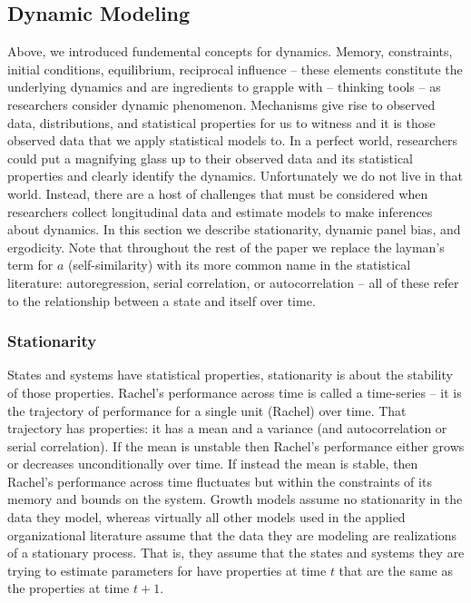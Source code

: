 \documentclass[english,,man]{apa6}
\theoremstyle{definition}
\theoremstyle{definition}
\theoremstyle{definition}
\theoremstyle{remark}
\begin{document}
\hypertarget{dynamic-modeling}{%
\subsection{Dynamic Modeling}\label{dynamic-modeling}}

Above, we introduced fundemental concepts for dynamics. Memory,
constraints, initial conditions, equilibrium, reciprocal influence --
these elements constitute the underlying dynamics and are ingredients to
grapple with -- thinking tools -- as researchers consider dynamic
phenomenon. Mechanisms give rise to observed data, distributions, and
statistical properties for us to witness and it is those observed data
that we apply statistical models to. In a perfect world, researchers
could put a magnifying glass up to their observed data and its
statistical properties and clearly identify the dynamics. Unfortunately
we do not live in that world. Instead, there are a host of challenges
that must be considered when researchers collect longitudinal data and
estimate models to make inferences about dynamics. In this section we
describe stationarity, dynamic panel bias, and ergodicity. Note that
throughout the rest of the paper we replace the layman's term for \(a\)
(self-similarity) with its more common name in the statistical
literature: autoregression, serial correlation, or autocorrelation --
all of these refer to the relationship between a state and itself over
time.

\hypertarget{stationarity}{%
\subsubsection{Stationarity}\label{stationarity}}

States and systems have statistical properties, stationarity is about
the stability of those properties. Rachel's performance across time is
called a time-series -- it is the trajectory of performance for a single
unit (Rachel) over time. That trajectory has properties: it has a mean
and a variance (and autocorrelation or serial correlation). If the mean
is unstable then Rachel's performance either grows or decreases
unconditionally over time. If instead the mean is stable, then Rachel's
performance across time fluctuates but within the constraints of its
memory and bounds on the system. Growth models assume no stationarity in
the data they model, whereas virtually all other models used in the
applied organizational literature assume that the data they are modeling
are realizations of a stationary process. That is, they assume that the
states and systems they are trying to estimate parameters for have
properties at time \(t\) that are the same as the properties at time
\(t + 1\).
\end{document}
